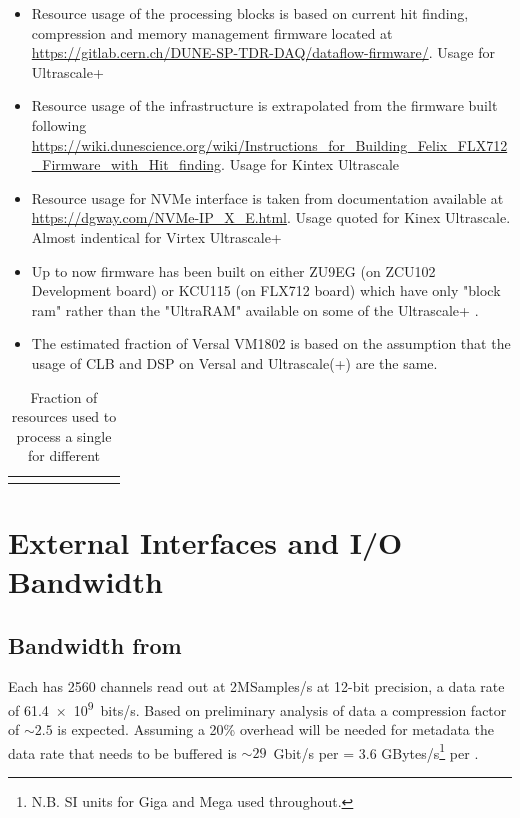 \documentclass{article}
\begin{document}
\begin{itemize}
    \item Resource usage of the processing blocks is based on current hit finding, compression and memory management firmware located at \url{https://gitlab.cern.ch/DUNE-SP-TDR-DAQ/dataflow-firmware/}. Usage for Ultrascale+
    \item Resource usage of the  infrastructure is extrapolated from the firmware built following \url{https://wiki.dunescience.org/wiki/Instructions_for_Building_Felix_FLX712_Firmware_with_Hit_finding}. Usage for Kintex Ultrascale
    \item Resource usage for NVMe interface is taken from documentation available at \url{https://dgway.com/NVMe-IP_X_E.html}. Usage quoted for Kinex Ultrascale. Almost indentical for Virtex Ultrascale+
    \item Up to now firmware has been built on either ZU9EG (on ZCU102 Development board) or KCU115 (on FLX712  board) which have only "block ram" rather than the "UltraRAM" available on some of the Ultrascale+ .
    \item The estimated fraction of Versal VM1802 is based on the assumption that the usage of CLB and DSP on Versal and Ultrascale(+) are the same.
\end{itemize}

\begin{table}[ht]
\begin{tabular}{p{2.2cm} | p{1.5cm} | p{1.3cm} p{1.3cm} | p{1.3cm} p{1.5cm} | p{1.3cm} p{1.5cm}}
\end{tabular}
\caption{Fraction of  resources used to process a single  for different  }
\label{tab:resource_fraction}
\end{table}

\section{External Interfaces and I/O Bandwidth}

\subsection{Bandwidth from }

Each \single {} has 2560 channels read out at 2MSamples/s at 12-bit precision, a data rate of  \SI{61.4e9}{bits/\second}. Based on preliminary analysis of  data\cite{ref:waldron_protodune_compression} a compression factor of $\sim 2.5$ is expected. Assuming a 20\% overhead will be needed for metadata the data rate that needs to be buffered is $\sim 29$~Gbit/s per  = 3.6 GBytes/s\footnote{N.B. SI units for Giga and Mega used throughout.} per .
\end{document}
